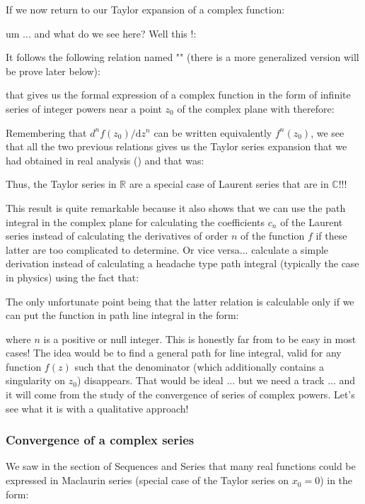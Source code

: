 	If we now return to our Taylor expansion of a complex function:
	
	um ... and what do we see here? Well this !:
	
	It follows the following relation named "" (there is a more generalized version will be prove later below):
	
	that gives us the formal expression of a complex function in the form of infinite series of integer powers near a point $z_0$ of the complex plane with therefore:
	
	Remembering that $d^{n}f(z_0)/\mathrm{d}z^n$ can be written equivalently $f^n(z_0)$, we see that all the two previous relations gives us the Taylor series expansion that we had obtained in real analysis () and that was:
	
	Thus, the Taylor series in $\mathbb{R}$ are a special case of Laurent series that are in $\mathbb{C}$!!!
	
	This result is quite remarkable because it also shows that we can use the path integral in the complex plane for calculating the coefficients $c_n$ of the Laurent series instead of calculating the derivatives of order $n$ of the function $f$ if these latter are too complicated to determine. Or vice versa... calculate a simple derivation instead of calculating a headache type path integral (typically the case in physics) using the fact that:
	
	The only unfortunate point being that the latter relation is calculable only if we can put the function in path line integral in the form:
	
	where $n$ is a positive or null integer. This is honestly far from to be easy in most cases! The idea would be to find a general path for line integral, valid for any function $f (z)$ such that the denominator (which additionally contains a singularity on $z_0$) disappears. That would be ideal ... but we need a track ... and it will come from the study of the convergence of series of complex powers. Let's see what it is with a qualitative approach!
	
	\pagebreak
	\subsubsection{Convergence of a complex series}
	We saw in the section of Sequences and Series that many real functions could be expressed in Maclaurin series (special case of the Taylor series on $x_0=0$) in the form:
	
